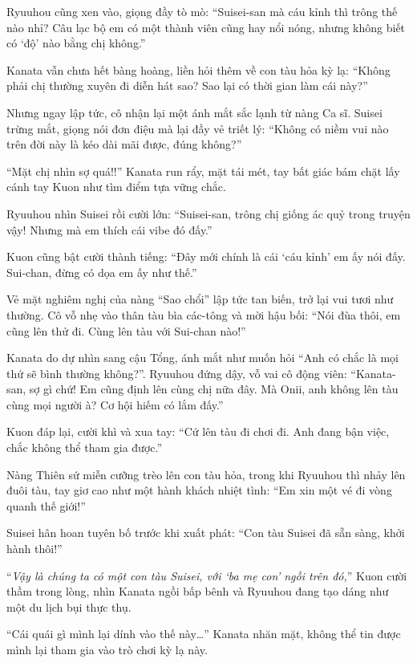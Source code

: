 \documentclass[../main.tex]{subfiles}
\begin{document}
Ryuuhou cũng xen vào, giọng đầy tò mò: ``Suisei-san mà cáu kỉnh thì trông thế nào nhỉ? Câu lạc bộ em có một thành viên cũng hay nổi nóng, nhưng không biết có `độ' nào bằng chị không.''

Kanata vẫn chưa hết bàng hoàng, liền hỏi thêm về con tàu hỏa kỳ lạ: ``Không phải chị thường xuyên đi diễn hát sao? Sao lại có thời gian làm cái này?''

Nhưng ngay lập tức, cô nhận lại một ánh mắt sắc lạnh từ nàng Ca sĩ. Suisei trừng mắt, giọng nói đơn điệu mà lại đầy vẻ triết lý: ``Không có niềm vui nào trên đời này là kéo dài mãi được, đúng không?''


``Mặt chị nhìn sợ quá!!'' Kanata run rẩy, mặt tái mét, tay bất giác bám chặt lấy cánh tay Kuon như tìm điểm tựa vững chắc.

Ryuuhou nhìn Suisei rồi cười lớn: ``Suisei-san, trông chị giống ác quỷ trong truyện vậy! Nhưng mà em thích cái vibe đó đấy.''

Kuon cũng bật cười thành tiếng: ``Đây mới chính là cái `cáu kỉnh' em ấy nói đấy. Sui-chan, đừng có dọa em ấy như thế.''

Vẻ mặt nghiêm nghị của nàng ``Sao chổi'' lập tức tan biến, trở lại vui tươi như thường. Cô vỗ nhẹ vào thân tàu bìa các-tông và mời hậu bối: ``Nói đùa thôi, em cũng lên thử đi. Cùng lên tàu với Sui-chan nào!''

Kanata do dự nhìn sang cậu Tổng, ánh mắt như muốn hỏi ``Anh có chắc là mọi thứ sẽ bình thường không?''. Ryuuhou đứng dậy, vỗ vai cô động viên: ``Kanata-san, sợ gì chứ! Em cũng định lên cùng chị nữa đây. Mà Onii, anh không lên tàu cùng mọi người à? Cơ hội hiếm có lắm đấy.''

Kuon đáp lại, cười khì và xua tay: ``Cứ lên tàu đi chơi đi. Anh đang bận việc, chắc không thể tham gia được.''

Nàng Thiên sứ miễn cưỡng trèo lên con tàu hỏa, trong khi Ryuuhou thì nhảy lên đuôi tàu, tay giơ cao như một hành khách nhiệt tình: ``Em xin một vé đi vòng quanh thế giới!''

Suisei hân hoan tuyên bố trước khi xuất phát: ``Con tàu Suisei đã sẵn sàng, khởi hành thôi!''

``\textit{Vậy là chúng ta có một con tàu Suisei, với `ba mẹ con' ngồi trên đó,}'' Kuon cười thầm trong lòng, nhìn Kanata ngồi bấp bênh và Ryuuhou đang tạo dáng như một du lịch bụi thực thụ.


``Cái quái gì mình lại dính vào thế này\dots'' Kanata nhăn mặt, không thể tin được mình lại tham gia vào trò chơi kỳ lạ này.
\end{document}

